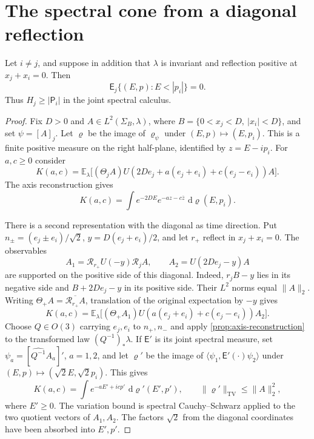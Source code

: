 \documentclass[11pt,letterpaper,reqno]{amsart}
\newcommand{\E}{\mathbb E}
\newcommand{\dd}{\,\mathrm d}
\begin{document}
\section{The spectral cone from a diagonal reflection}\label{sec:cone}

\begin{proposition}\label{prop:diagonal-cone}
Let $i\ne j$, and suppose in addition that $\lambda$ is invariant
and reflection positive at $x_j+x_i=0$. Then
\begin{equation}\label{eq:sharp-coordinate-cone}
 \mathsf E_j\{(E,p):E<|p_i|\}=0.
\end{equation}
Thus $H_j\ge|\mathsf P_i|$ in the joint spectral calculus.
\end{proposition}

\begin{proof}
Fix $D>0$ and $A\in L^2(\Sigma_B,\lambda)$, where
$B=\{0<x_j<D,\ |x_i|<D\}$, and set $\psi=[A]_j$.
Let $\varrho$ be the image of $\varrho_\psi$ under
$(E,p)\mapsto(E,p_i)$. This is a finite positive measure on the
right half-plane, identified by $z=E-ip_i$.
For $a,c\ge0$ consider
\[
 K(a,c)=\E_\lambda\bigl[(\Theta_j A)
 U(2De_j+a(e_j+e_i)+c(e_j-e_i))A\bigr].
\]
The axis reconstruction gives
\begin{equation}\label{eq:cone-first-picture}
 K(a,c)=\int e^{-2DE}e^{-az-c\overline z}\,\dd\varrho(E,p_i).
\end{equation}

There is a second representation with the diagonal as time direction.
Put $n_\pm=(e_j\pm e_i)/\sqrt2$, $y=D(e_j+e_i)/2$, and let
$r_+$ reflect in $x_j+x_i=0$. The observables
\[
 A_1=\mathcal R_{r_+}U(-y)\mathcal R_j A,
 \qquad A_2=U(2De_j-y)A
\]
are supported on the positive side of this diagonal. Indeed,
$r_jB-y$ lies in its negative side and $B+2De_j-y$ in its positive
side. Their $L^2$ norms equal $\|A\|_2$.
Writing $\Theta_+A=\overline{\mathcal R_{r_+}A}$, translation of
the original expectation by $-y$ gives
\[
 K(a,c)=\E_\lambda\bigl[(\Theta_+A_1)
 U(a(e_j+e_i)+c(e_j-e_i))A_2\bigr].
\]
Choose $Q\in O(3)$ carrying $e_j,e_i$ to $n_+,n_-$ and apply
\cref{prop:axis-reconstruction} to the transformed law
$(Q^{-1})_*\lambda$. If $\mathsf E'$ is its joint spectral measure,
set $\psi_a=[\widehat{Q^{-1}}A_a]'$, $a=1,2$, and let
$\varrho'$ be the image of
$\langle\psi_1,\mathsf E'(\cdot)\psi_2\rangle$
under $(E,p)\mapsto(\sqrt2E,\sqrt2p_i)$. This gives
\begin{equation}\label{eq:cone-second-picture}
 K(a,c)=\int e^{-aE'+icp'}\,\dd\varrho'(E',p'),
 \qquad \|\varrho'\|_{\mathrm{TV}}\le\|A\|_2^2,
\end{equation}
where $E'\ge0$. The variation bound is spectral
Cauchy--Schwarz applied to the two quotient vectors of $A_1,A_2$.
The factors $\sqrt2$ from the diagonal coordinates have been absorbed
into $E',p'$.


\end{proof}
\end{document}
